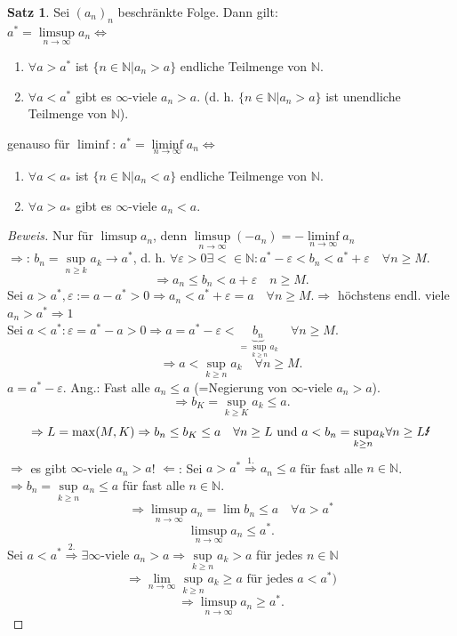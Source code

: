 \documentclass[12pt,a4paper,titlepage]{article} %
\theoremstyle{definition}
\newtheorem{satz}{Satz}[subsection]
\theoremstyle{remark}
\newenvironment{bew}{\begin{proof}[Beweis]}{\end{proof}}
\newcommand{\N}{\mathbb{N}}
\newcommand{\limes}[1]{\lim\limits_{#1\rightarrow\infty}}
\begin{document}
\begin{satz}
	Sei \((a_n)_n\) beschränkte Folge. Dann gilt:\\
	\(a^* = \limsup\limits_{n\rightarrow\infty}a_n \Leftrightarrow \)
	\begin{enumerate}
		\item \(\forall a> a^* \) ist \( \{n\in\N |a_n>a \} \) endliche Teilmenge von \(\N\).
		\item \( \forall a<a^* \) gibt es \(\infty\)-viele \(a_n >a\). (d. h. \( \{ n\in\N|a_n>a \} \) ist unendliche Teilmenge von \(\N\)).
	\end{enumerate}
	genauso für \( \liminf \):
	\(a^* = \liminf\limits_{n\rightarrow\infty}a_n \Leftrightarrow \)
	\begin{enumerate}
		\item \(\forall a< a_* \) ist \( \{n\in\N |a_n<a \} \) endliche Teilmenge von \(\N\).
		\item \( \forall a>a_* \) gibt es \(\infty\)-viele \(a_n<a\).
	\end{enumerate}
\end{satz}
\begin{bew}
	Nur für \( \limsup a_n \), denn \( \limsup\limits_{n\rightarrow\infty}(-a_n) = -\liminf\limits_{n\rightarrow\infty} a_n \)\\
	\glqq\( \Rightarrow \)\grqq: \(b_n = \underset{n\geq k}{\sup}a_k \rightarrow a^* \), d. h. \( \forall \varepsilon>0\exists <\in\N: a^*-\varepsilon < b_n < a^* + \varepsilon \quad \forall n\geq M. \)\\
	\[ \Rightarrow a_n \leq b_n < a + \varepsilon \quad n\geq M. \]
	Sei \(  a>a^*, \varepsilon := a-a^* >0 \Rightarrow a_n < a^* + \varepsilon = a \quad \forall n\geq M. \Rightarrow \) höchstens endl. viele \( a_n >a^* \Rightarrow 1 \)\\
	Sei \( a< a^*: \varepsilon = a^*-a >0 \Rightarrow a=a^*-\varepsilon < \underbrace{b_n}_{=\underset{k\geq n}{\sup} a_k} \quad \forall n\geq M. \)\\
	\[ \Rightarrow a < \underset{k\geq n}{\sup} a_k \quad \forall n\geq M. \]
	\(a=a^* - \varepsilon \).
	Ang.: Fast alle \(a_n \leq a \) (=Negierung von \( \infty \)-viele \(a_n>a\)).\\
	\[ \Rightarrow b_K = \underset{k\geq K}{\sup} a_k \leq a. \]
	\[ \Rightarrow L = \max(M,K) \Rightarrow b_n \leq b_K \leq a \quad \forall n\geq L \text{ und } a<b_n=\underset{k\geq n}{\sup}a_k \forall n\geq L \text{\Lightning} \]
	\( \Rightarrow \) es gibt \(\infty\)-viele \(a_n>a\)!
	\glqq\( \Leftarrow \)\grqq: Sei \(a>a^* \overset{\text{1.}}{\Rightarrow} a_n \leq a \) für fast alle \(n\in\N\).\\
	\( \Rightarrow b_n = \underset{k\geq n}{\sup}a_n \leq a \) für fast alle \(n\in\N\).\\
	\[ \Rightarrow \limsup\limits_{n\rightarrow\infty} a_n = \lim b_n \leq a \quad \forall a> a^* \]
	\[ \limsup\limits_{n\rightarrow\infty} a_n \leq a^*. \]
	Sei \(a<a^* \overset{\text{2.}}{\Rightarrow} \exists \infty \)-viele \(a_n > a \Rightarrow \underset{k\geq n}{\sup} a_k > a \) für jedes \(n\in\N\) 
	\[ \Rightarrow \limes{n}\underset{k\geq n}{\sup}a_k \geq a \text{ für jedes }a<a^*) \]
	\[ \Rightarrow \limsup\limits_{n\rightarrow\infty} a_n\geq a^*. \]
\end{bew}
\end{document}

